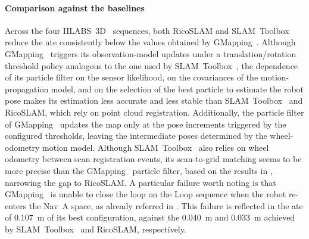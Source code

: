 \paragraph{Comparison against the baselines}
Across the four IILABS~3D~\cite{ribeiro:access:2025} sequences, both
RicoSLAM and SLAM~Toolbox~\cite{macenski-jambrecic:joss:2021} reduce the
\gls{ate} consistently below the values obtained by
GMapping~\cite{grisetti:tro:2007}. Although
GMapping~\cite{grisetti:tro:2007} triggers its observation-model updates
under a translation/rotation threshold policy analogous to the one used by
SLAM~Toolbox~\cite{macenski-jambrecic:joss:2021}, the dependence of
its particle filter on the sensor likelihood, on the covariances of
the motion-propagation model, and on the selection of the best particle
to estimate the robot pose makes its estimation less accurate and less
stable than SLAM~Toolbox~\cite{macenski-jambrecic:joss:2021} and RicoSLAM,
which rely on point cloud registration.
Additionally, the particle filter of GMapping~\cite{grisetti:tro:2007} updates
the map only at the pose increments triggered by the configured thresholds,
leaving the intermediate poses determined by the wheel-odometry motion model.
Although SLAM~Toolbox~\cite{macenski-jambrecic:joss:2021} also relies on
wheel odometry between scan registration events, its scan-to-grid
matching seems to be more precise than the GMapping~\cite{grisetti:tro:2007}
particle filter, based on the results in ,
narrowing the gap to RicoSLAM.
A particular failure worth noting is that GMapping~\cite{grisetti:tro:2007} is
unable to close the loop on the Loop sequence when the robot re-enters the
Nav~A space, as already referred in .
This failure is reflected in the \gls{ate} of \SI{0.107}{\metre} of its best
configuration, against the \SI{0.040}{\metre} and
\SI{0.033}{\metre} achieved by SLAM~Toolbox~\cite{macenski-jambrecic:joss:2021}
and RicoSLAM, respectively.

